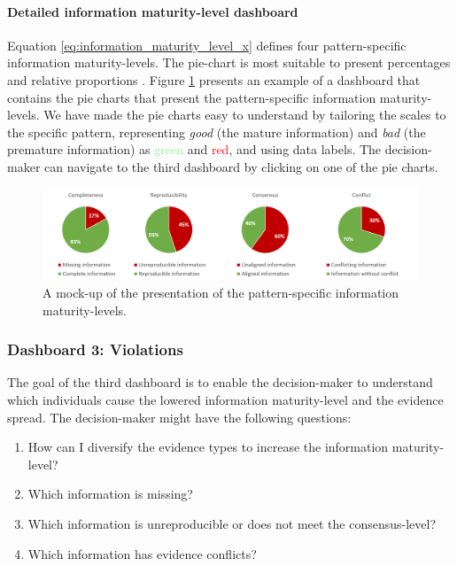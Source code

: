 \paragraph{Detailed information maturity-level dashboard}
Equation \ref{eq:information_maturity_level_x} defines four pattern-specific information maturity-levels. The pie-chart is most suitable to present percentages and relative proportions \parencite{OTH09}. Figure \ref{fig:Dashboard_Component_2} presents an example of a dashboard that contains the pie charts that present the pattern-specific information maturity-levels. We have made the pie charts easy to understand by tailoring the scales to the specific pattern, representing \emph{good} (the mature information) and \emph{bad} (the premature information) as \textcolor{LightGreen}{green} and \textcolor{Red}{red}, and using data labels. The decision-maker can navigate to the third dashboard by clicking on one of the pie charts. 

\begin{figure}[H]
\centering
  \includegraphics[width=17cm]{../../Images/04_Contribution/Dashboard_Component_2.png}
  \caption{A mock-up of the presentation of the pattern-specific information maturity-levels.}
  \label{fig:Dashboard_Component_2}
\end{figure} 

\subsubsection{Dashboard 3: Violations}
The goal of the third dashboard is to enable the decision-maker to understand which individuals cause the lowered information maturity-level and the evidence spread. The decision-maker might have the following questions:
\begin{enumerate}
\item How can I diversify the evidence types to increase the information maturity-level?
\item Which information is missing?
\item Which information is unreproducible or does not meet the consensus-level?
\item Which information has evidence conflicts?
\end{enumerate}

